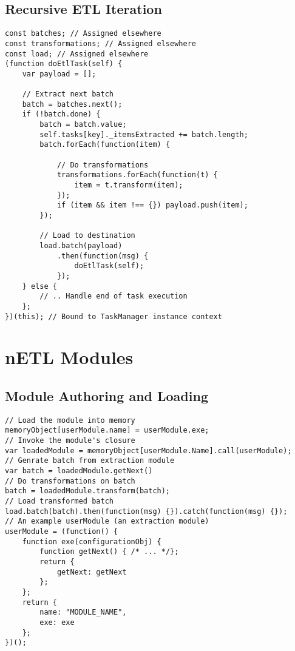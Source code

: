 \subsection{Recursive ETL Iteration}
\label{netl-recursive-iterator}
\begin{verbatim}
const batches; // Assigned elsewhere
const transformations; // Assigned elsewhere
const load; // Assigned elsewhere
(function doEtlTask(self) {
    var payload = [];

    // Extract next batch
    batch = batches.next();
    if (!batch.done) {
        batch = batch.value;
        self.tasks[key]._itemsExtracted += batch.length;
        batch.forEach(function(item) {

            // Do transformations
            transformations.forEach(function(t) {
                item = t.transform(item);
            });
            if (item && item !== {}) payload.push(item);
        });

        // Load to destination
        load.batch(payload)
            .then(function(msg) {
                doEtlTask(self);
            });
    } else {
        // .. Handle end of task execution
    };
})(this); // Bound to TaskManager instance context
\end{verbatim}

\section{nETL Modules}
\label{netl-modules}

\subsection{Module Authoring and Loading}
\label{netl-module-loading}
\begin{verbatim}
// Load the module into memory
memoryObject[userModule.name] = userModule.exe;
// Invoke the module's closure
var loadedModule = memoryObject[userModule.Name].call(userModule);
// Genrate batch from extraction module
var batch = loadedModule.getNext()
// Do transformations on batch
batch = loadedModule.transform(batch);
// Load transformed batch
load.batch(batch).then(function(msg) {}).catch(function(msg) {});
// An example userModule (an extraction module)
userModule = (function() {
    function exe(configurationObj) {
        function getNext() { /* ... */};
        return {
            getNext: getNext
        };
    };
    return {
        name: "MODULE_NAME",
        exe: exe
    };
})();
\end{verbatim}


